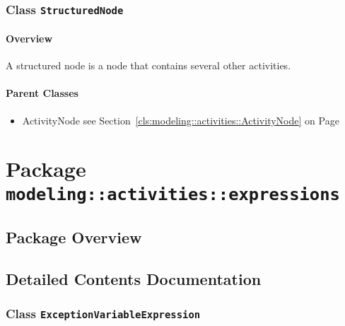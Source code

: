 \subsubsection{\Large{Class \bfseries \texttt{StructuredNode}\normalfont}}
\label{cls:modeling::activities::StructuredNode} 
\paragraph{Overview}

	
			
A structured node is a node that contains several other activities.	
		
	



\paragraph{Parent Classes}
\begin{itemize}
\item ActivityNode see Section~\ref{cls:modeling::activities::ActivityNode} on Page~\pageref{cls:modeling::activities::ActivityNode}\end{itemize}
\newpage
		


\section{Package \bfseries \texttt{modeling::activities::expressions}\normalfont}
\subsection{Package Overview}
	
			
		



\subsection{Detailed Contents Documentation}
\subsubsection{\Large{Class \bfseries \texttt{ExceptionVariableExpression}\normalfont}}
\label{cls:modeling::activities::expressions::ExceptionVariableExpression} 
